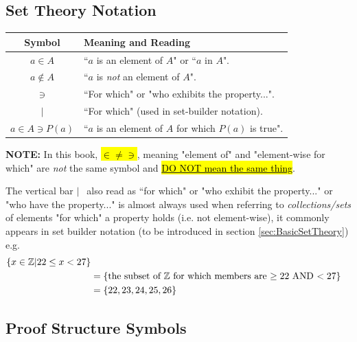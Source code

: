 \subsection{Set Theory Notation}

\begin{center}
\begin{tabular}{|c|l|}
    \hline
    \textbf{Symbol} & \textbf{Meaning and Reading} \\
    \hline
    $a \in A$ & ``$a$ is an element of $A$" or ``$a$ in $A$". \index{$\in$} \\
    $a \not\in A$ & ``$a$ is \textit{not} an element of $A$". \index{$\not\in$} \\
    $\ni$ & ``For which" or "who exhibits the property...". \index{$\ni$}\\
    $|$ & ``For which" (used in set-builder notation). \\
    $a \in A \ni P(a)$ & ``$a$ is an element of $A$ for which $P(a)$ is true". \\
    \hline
\end{tabular}
\end{center}

\begin{tcolorbox}
\begin{center}
\textbf{NOTE:} In this book, \hl{$\in \neq \ni$}, meaning "element of" and "element-wise for which" are \textit{not} the same symbol and \underline{\hl{DO NOT mean the same thing}}.
\end{center}
\end{tcolorbox}

\noindent The vertical bar  $| \ \ $ also read as ``for which" or "who exhibit the property..." or "who have the property..." is almost always used when referring to \textit{collections/sets} of elements "for which" a property holds (i.e. not element-wise), it commonly appears in set builder notation (to be introduced in section \ref{sec:BasicSetTheory}) e.g. 
\begin{align}
    \{x\in {\mathbb{ Z}} | 22\leq x < 27\}  \nonumber \\
    &= \{ \text{the subset of ${\mathbb{ Z}}$ for which members are $\geq 22$ AND $<27$} \} \nonumber \\
    &= \{22,23,24,25,26\}\nonumber
\end{align}

\subsection{Proof Structure Symbols}

